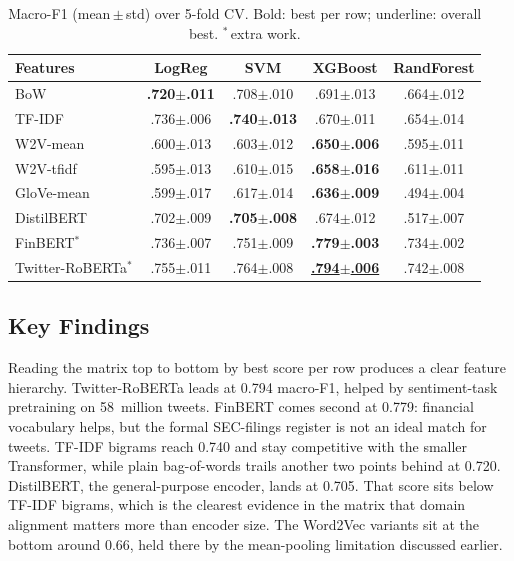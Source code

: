 \documentclass[12pt,a4paper]{article}
\begin{document}
\begin{table}[!htbp]
\centering
\small
\begin{tabular}{l|cccc}
\toprule
\textbf{Features} & \textbf{LogReg} & \textbf{SVM} & \textbf{XGBoost} & \textbf{RandForest} \\
\midrule
BoW              & \textbf{.720$\pm$.011} & .708$\pm$.010 & .691$\pm$.013 & .664$\pm$.012 \\
TF-IDF           & .736$\pm$.006 & \textbf{.740$\pm$.013} & .670$\pm$.011 & .654$\pm$.014 \\
W2V-mean         & .600$\pm$.013 & .603$\pm$.012 & \textbf{.650$\pm$.006} & .595$\pm$.011 \\
W2V-tfidf        & .595$\pm$.013 & .610$\pm$.015 & \textbf{.658$\pm$.016} & .611$\pm$.011 \\
GloVe-mean       & .599$\pm$.017 & .617$\pm$.014 & \textbf{.636$\pm$.009} & .494$\pm$.004 \\
DistilBERT       & .702$\pm$.009 & \textbf{.705$\pm$.008} & .674$\pm$.012 & .517$\pm$.007 \\
FinBERT$^{*}$         & .736$\pm$.007 & .751$\pm$.009 & \textbf{.779$\pm$.003} & .734$\pm$.002 \\
Twitter-RoBERTa$^{*}$ & .755$\pm$.011 & .764$\pm$.008 & \underline{\textbf{.794$\pm$.006}} & .742$\pm$.008 \\
\bottomrule
\end{tabular}
\caption{Macro-F1 (mean\,$\pm$\,std) over 5-fold CV. Bold: best per row; underline: overall best. $^{*}$\,extra work.}
\label{tab:results}
\end{table}

\subsection{Key Findings}

Reading the matrix top to bottom by best score per row produces a clear feature hierarchy. Twitter-RoBERTa leads at 0.794 macro-F1, helped by sentiment-task pretraining on 58~million tweets. FinBERT comes second at 0.779: financial vocabulary helps, but the formal SEC-filings register is not an ideal match for tweets. TF-IDF bigrams reach 0.740 and stay competitive with the smaller Transformer, while plain bag-of-words trails another two points behind at 0.720. DistilBERT, the general-purpose encoder, lands at 0.705. That score sits below TF-IDF bigrams, which is the clearest evidence in the matrix that domain alignment matters more than encoder size. The Word2Vec variants sit at the bottom around 0.66, held there by the mean-pooling limitation discussed earlier.
\end{document}
